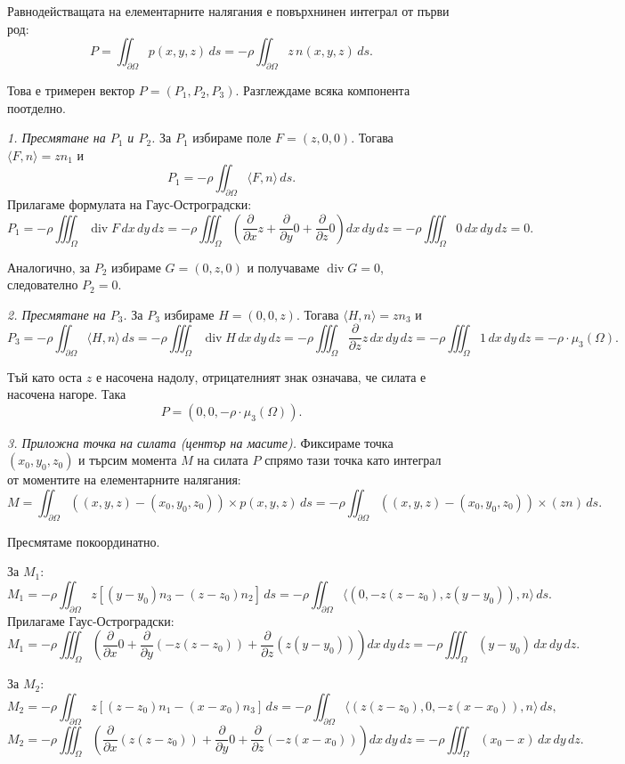 \documentclass[10pt]{article}
\begin{document}
Равнодействащата на елементарните налягания е повърхнинен интеграл от първи род:
\[
P = \iint_{\partial\Omega} p(x,y,z) \, ds = -\rho \iint_{\partial\Omega} z \, n(x,y,z) \, ds.
\]

Това е тримерен вектор $P = (P_1,P_2,P_3)$. Разглеждаме всяка компонента поотделно.

\textit{1. Пресмятане на $P_1$ и $P_2$.} 
За $P_1$ избираме поле $F = (z,0,0)$. Тогава $\langle F, n \rangle = z n_1$ и
\[
P_1 = -\rho \iint_{\partial\Omega} \langle F, n \rangle \, ds.
\]
Прилагаме формулата на Гаус-Остроградски:
\[
P_1 = -\rho \iiint_{\Omega} \operatorname{div} F \, dx\,dy\,dz = -\rho \iiint_{\Omega} \left( \frac{\partial}{\partial x}z + \frac{\partial}{\partial y}0 + \frac{\partial}{\partial z}0 \right) dx\,dy\,dz = -\rho \iiint_{\Omega} 0 \, dx\,dy\,dz = 0.
\]

Аналогично, за $P_2$ избираме $G = (0,z,0)$ и получаваме $\operatorname{div} G = 0$, следователно $P_2 = 0$.

\textit{2. Пресмятане на $P_3$.} 
За $P_3$ избираме $H = (0,0,z)$. Тогава $\langle H, n \rangle = z n_3$ и
\[
P_3 = -\rho \iint_{\partial\Omega} \langle H, n \rangle \, ds = -\rho \iiint_{\Omega} \operatorname{div} H \, dx\,dy\,dz = -\rho \iiint_{\Omega} \frac{\partial}{\partial z}z \, dx\,dy\,dz = -\rho \iiint_{\Omega} 1 \, dx\,dy\,dz = -\rho \cdot \mu_3(\Omega).
\]

Тъй като оста $z$ е насочена надолу, отрицателният знак означава, че силата е насочена нагоре. Така
\[
P = (0,0, -\rho \cdot \mu_3(\Omega)).
\]

\textit{3. Приложна точка на силата (център на масите).} 
Фиксираме точка $(x_0,y_0,z_0)$ и търсим момента $M$ на силата $P$ спрямо тази точка като интеграл от моментите на елементарните налягания:
\[
M = \iint_{\partial\Omega} ((x,y,z) - (x_0,y_0,z_0)) \times p(x,y,z) \, ds = -\rho \iint_{\partial\Omega} ((x,y,z)-(x_0,y_0,z_0)) \times (z n) \, ds.
\]

Пресмятаме покоординатно.

За $M_1$:
\[
M_1 = -\rho \iint_{\partial\Omega} z[(y-y_0)n_3 - (z-z_0)n_2] \, ds = -\rho \iint_{\partial\Omega} \langle (0, -z(z-z_0), z(y-y_0)), n \rangle \, ds.
\]
Прилагаме Гаус-Остроградски:
\[
M_1 = -\rho \iiint_{\Omega} \left( \frac{\partial}{\partial x}0 + \frac{\partial}{\partial y}(-z(z-z_0)) + \frac{\partial}{\partial z}(z(y-y_0)) \right) dx\,dy\,dz = -\rho \iiint_{\Omega} (y-y_0) \, dx\,dy\,dz.
\]

За $M_2$:
\[
M_2 = -\rho \iint_{\partial\Omega} z[(z-z_0)n_1 - (x-x_0)n_3] \, ds = -\rho \iint_{\partial\Omega} \langle (z(z-z_0), 0, -z(x-x_0)), n \rangle \, ds,
\]
\[
M_2 = -\rho \iiint_{\Omega} \left( \frac{\partial}{\partial x}(z(z-z_0)) + \frac{\partial}{\partial y}0 + \frac{\partial}{\partial z}(-z(x-x_0)) \right) dx\,dy\,dz = -\rho \iiint_{\Omega} (x_0 - x) \, dx\,dy\,dz.
\]
\end{document}
